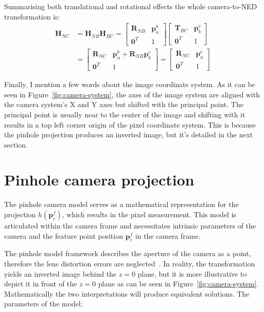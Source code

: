 Summarising both translational and rotational effects the whole camera-to-NED transformation is:
\begin{equation}
\begin{aligned}
    \mathbf{H}_{NC}&=\mathbf{H}_{NB}\mathbf{H}_{BC} = 
    \begin{bmatrix}
        \mathbf{R}_{NB} & \mathbf{p}_{n}^b\\
        \mathbf{0}^T & 1
    \end{bmatrix} 
    \begin{bmatrix}
        \mathbf{T}_{BC} & \mathbf{p}_b^c\\
        \mathbf{0}^T & 1
    \end{bmatrix} \\ &=
    \begin{bmatrix}
        \mathbf{R}_{NC} & \mathbf{p}_n^b+\mathbf{R}_{NB}\mathbf{p}_b^c \\
        \mathbf{0}^T & 1
    \end{bmatrix} =
    \begin{bmatrix}
        \mathbf{R}_{NC} & \mathbf{p}_n^c \\
        \mathbf{0}^T & 1
    \end{bmatrix}
\end{aligned}
\label{eq:body2camera}
\end{equation}

Finally, I mention a few words about the image coordinate system. As it can be seen in Figure~\ref{fig:camera-system}, the axes of the image system are aligned with the camera system's X and Y axes but shifted with the principal point. The principal point is usually near to the center of the image and shifting with it results in a top left corner origin of the pixel coordinate system. This is because the pinhole projection produces an inverted image, but it's detailed in the next section.

\section{Pinhole camera projection}

The pinhole camera model serves as a mathematical representation for the projection $h(\mathbf{p}_c^f)$, which results in the pixel measurement. This model is articulated within the camera frame and necessitates intrinsic parameters of the camera and the feature point position $\mathbf{p}_c^f$ in the camera frame. 

The pinhole model framework describes the aperture of the camera as a point, therefore the lens distortion errors are neglected~\cite{pinhole_wikipedia, stanford_camera_models}. In reality, the transformation yields an inverted image behind the $z=0$ plane, but it is more illustrative to depict it in front of the $z=0$ plane as can be seen in Figure~\ref{fig:camera-system}. Mathematically the two interpretations will produce equivalent solutions. The parameters of the model: 

